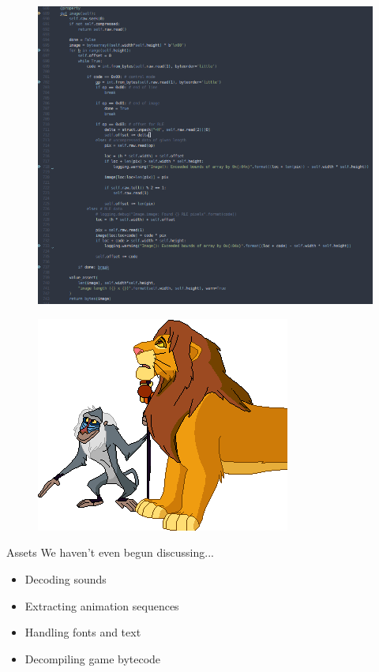 \documentclass[xcolor={dvipsnames,table},aspectratio=169]{beamer}
\let\olditem\item
\renewcommand{\item}{\olditem\vspace{8pt}}
\begin{document}
\begin{frame}
  \vspace{-1em}
  \begin{figure}
    \includegraphics[height=\textheight]{imagecode}
  \end{figure}
\end{frame}

\begin{frame}
  \begin{figure}
    \includegraphics[height=\textheight]{85-0}
  \end{figure}
\end{frame}

\begin{frame}{Assets}
  \Large We haven't even begun discussing...
  \begin{itemize}
    \item Decoding sounds\pause
    \item Extracting animation sequences\pause
    \item Handling fonts and text\pause
    \item Decompiling game bytecode
  \end{itemize}
\end{frame}
\end{document}
